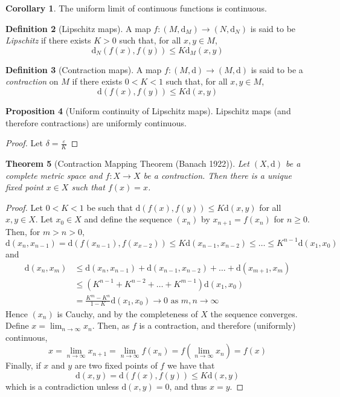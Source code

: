 \documentclass[10pt,fleqn]{article}
\newcommand{\met}{\mathrm{d}}
\newcommand{\eps}{\varepsilon}
\theoremstyle{definition} \newtheorem{defn}{Definition}[section]
\theoremstyle{plain}      \newtheorem{thm}[defn]{Theorem}
\theoremstyle{definition} \newtheorem{prop}[defn]{Proposition}
\theoremstyle{definition} \newtheorem{cor}[defn]{Corollary}
\theoremstyle{definition} \newtheorem{ex}[defn]{Example}
\theoremstyle{definition} \newtheorem{rem}[defn]{Remark}
\begin{document}
\begin{cor}
    The uniform limit of continuous functions is continuous.
\end{cor}

\begin{defn}[Lipschitz maps]
    A map $f:(M,\met_M)\to (N,\met_N)$ is said to be \emph{Lipschitz} if there exists $K>0$ such that, for all $x,y\in M$,
    \[
        \met_N(f(x),f(y))\leq
        K\met_M(x,y)
    \]
\end{defn}

\begin{defn}[Contraction maps]
    A map $f:(M,\met)\to(M,\met)$ is said to be a \emph{contraction} on $M$ if there exists $0<K<1$ such that, for all $x,y\in M$,
    \[
        \met(f(x),f(y))\leq
        K\met(x,y)
    \]
\end{defn}

\begin{prop}[Uniform continuity of Lipschitz maps]
    Lipschitz maps (and therefore contractions) are uniformly continuous.
\end{prop}

\begin{proof}
    Let $\delta=\frac{\eps}{K}$
\end{proof}

\begin{thm}[Contraction Mapping Theorem (Banach 1922)]
    Let $(X,\met)$ be a complete metric space and $f:X\to X$ be a contraction.
    Then there is a unique fixed point $x\in X$ such that $f(x)=x$.
\end{thm}

\begin{proof}
    Let $0<K<1$ be such that $\met(f(x),f(y))\leq K\met(x,y)$ for all $x,y\in X$.
    Let $x_0\in X$ and define the sequence $(x_n)$ by $x_{n+1}=f(x_n)$ for $n\geq 0$.
    Then, for $m>n>0$,
    \[
        \met(x_n,x_{n-1})=
        \met(f(x_{n-1}),f(x_{x-2}))\leq
        K\met(x_{n-1},x_{n-2})\leq
        \ldots\leq
        K^{n-1}\met(x_1,x_0)
    \]
    and
    \begin{align*}
        \met(x_n,x_m)&\leq\met(x_n,x_{n-1}) + \met(x_{n-1},x_{n-2}) + \ldots + \met(x_{m+1},x_m)\\
        &\leq(K^{n-1}+K^{n-2}+\ldots+K^{m-1})\met(x_1,x_0)\\
        &=\frac{K^m-K^n}{1-K}\met(x_1,x_0)\to0\text{ as }m,n\to\infty
    \end{align*}
    Hence $(x_n)$ is Cauchy, and by the completeness of $X$ the sequence converges.
    Define $x=\lim_{n\to\infty}x_n$.
    Then, as $f$ is a contraction, and therefore (uniformly) continuous,
    \[
        x=
        \lim_{n\to\infty}x_{n+1}=
        \lim_{n\to\infty}f(x_n)=
        f(\lim_{n\to\infty}x_n)=
        f(x)
    \]
    Finally, if $x$ and $y$ are two fixed points of $f$ we have that
    \[
        \met(x,y)=
        \met(f(x),f(y))\leq
        K\met(x,y)
    \]
    which is a contradiction unless $\met(x,y)=0$, and thus $x=y$.
\end{proof}
\end{document}
